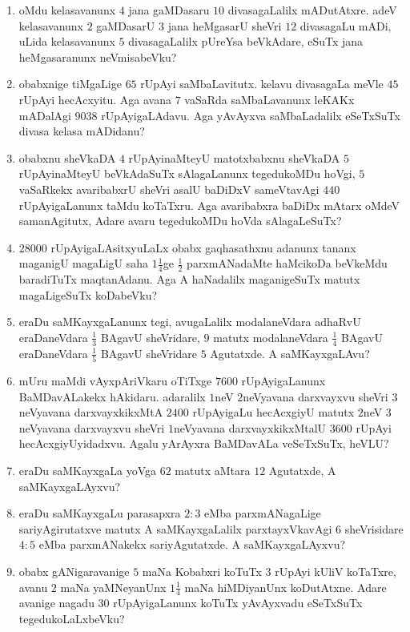 \begin{enumerate}
\item oMdu kelasavanunx $4$ jana gaMDasaru $10$ divasagaLalilx
mADutAtxre. adeV kelasavanunx $2$ gaMDasarU $3$ jana heMgasarU sheVri
$12$ divasagaLu mADi, uLida kelasavanunx $5$ divasagaLalilx pUreYsa
beVkAdare, eSuTx jana heMgasaranunx neVmisabeVku?

\item obabxnige tiMgaLige $65$ rUpAyi saMbaLavitutx. kelavu divasagaLa
meVle $45$ rUpAyi hecAcxyitu. Aga avana $7$ vaSaRda saMbaLavanunx
leKAKx mADalAgi $9038$ rUpAyigaLAdavu. Aga yAvAyxva saMbaLadalilx
eSeTxSuTx divasa kelasa mADidanu?

\item obabxnu sheVkaDA $4$ rUpAyinaMteyU matotxbabxnu sheVkaDA $5$
rUpAyinaMteyU beVkAdaSuTx sAlagaLanunx tegedukoMDu hoVgi, $5$
vaSaRkekx avaribabxrU sheVri asalU baDiDxV sameVtavAgi $440$
rUpAyigaLanunx taMdu koTaTxru. Aga avaribabxra baDiDx mAtarx oMdeV
samanAgitutx, Adare avaru tegedukoMDu hoVda sAlagaLeSuTx?

\item $28000$ rUpAyigaLAsitxyuLaLx obabx gaqhasathxnu adanunx tananx
maganigU magaLigU saha $1\frac{1}{4}$ge $\frac{1}{2}$ parxmANadaMte
haMcikoDa beVkeMdu baradiTuTx maqtanAdanu. Aga A haNadalilx
maganigeSuTx matutx magaLigeSuTx koDabeVku?

\item eraDu saMKayxgaLanunx tegi, avugaLalilx modalaneVdara adhaRvU
eraDaneVdara $\frac{1}{3}$ BAgavU sheVridare, $9$ matutx modalaneVdara
$\frac{1}{4}$ BAgavU eraDaneVdara $\frac{1}{5}$ BAgavU sheVridare $5$
Agutatxde. A saMKayxgaLAvu?

\item mUru maMdi vAyxpAriVkaru oTiTxge $7600$ rUpAyigaLanunx
BaMDavALakekx hAkidaru. adaralilx  $1$neV $2$neVyavana darxvayxvu
sheVri $3$neVyavana darxvayxkikxMtA $2400$ rUpAyigaLu hecAcxgiyU
matutx $2$neV $3$neVyavana darxvayxvu sheVri $1$neVyavana
darxvayxkikxMtalU $3600$ rUpAyi hecAcxgiyUyidadxvu. Agalu yArAyxra
BaMDavALa veSeTxSuTx, heVLU?

\item eraDu saMKayxgaLa yoVga $62$ matutx aMtara $12$ Agutatxde, A
saMKayxgaLAyxvu?

\item eraDu saMKayxgaLu parasapxra $2:3$ eMba parxmANagaLige
sariyAgirutatxve matutx A saMKayxgaLalilx parxtayxVkavAgi $6$
sheVrisidare $4:5$ eMba parxmANakekx sariyAgutatxde. A
saMKayxgaLAyxvu?

\item obabx gANigaravanige $5$ maNa Kobabxri koTuTx $3$ rUpAyi kUliV
koTaTxre, avanu $2$ maNa yaMNeyanUnx $1 \frac{1}{4}$ maNa hiMDiyanUnx
koDutAtxne. Adare avanige nagadu $30$ rUpAyigaLanunx koTuTx yAvAyxvadu
eSeTxSuTx tegedukoLaLxbeVku?


\end{enumerate}

